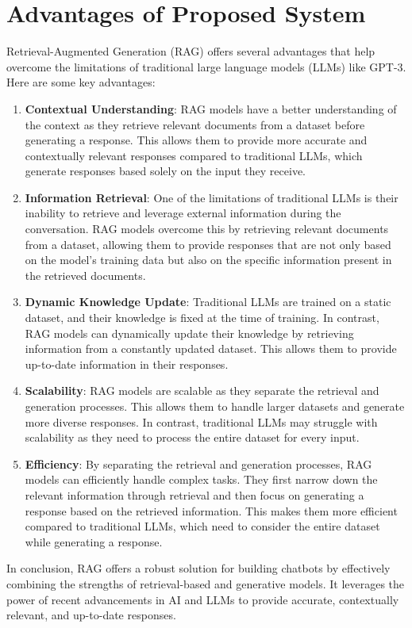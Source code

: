 \section{Advantages of Proposed System}
Retrieval-Augmented Generation (RAG) offers several advantages that help overcome the limitations of traditional large language models (LLMs) like GPT-3. Here are some key advantages:
\begin{enumerate}
  \item \textbf{Contextual Understanding}: RAG models have a better understanding of the context as they retrieve relevant documents from a dataset before generating a response. This allows them to provide more accurate and contextually relevant responses compared to traditional LLMs, which generate responses based solely on the input they receive.
  \item \textbf{Information Retrieval}: One of the limitations of traditional LLMs is their inability to retrieve and leverage external information during the conversation. RAG models overcome this by retrieving relevant documents from a dataset, allowing them to provide responses that are not only based on the model's training data but also on the specific information present in the retrieved documents.
  \item \textbf{Dynamic Knowledge Update}: Traditional LLMs are trained on a static dataset, and their knowledge is fixed at the time of training. In contrast, RAG models can dynamically update their knowledge by retrieving information from a constantly updated dataset. This allows them to provide up-to-date information in their responses.
  \item \textbf{Scalability}: RAG models are scalable as they separate the retrieval and generation processes. This allows them to handle larger datasets and generate more diverse responses. In contrast, traditional LLMs may struggle with scalability as they need to process the entire dataset for every input.
  \item \textbf{Efficiency}: By separating the retrieval and generation processes, RAG models can efficiently handle complex tasks. They first narrow down the relevant information through retrieval and then focus on generating a response based on the retrieved information. This makes them more efficient compared to traditional LLMs, which need to consider the entire dataset while generating a response.
\end{enumerate}
In conclusion, RAG offers a robust solution for building chatbots by effectively combining the strengths of retrieval-based and generative models. It leverages the power of recent advancements in AI and LLMs to provide accurate, contextually relevant, and up-to-date responses.
